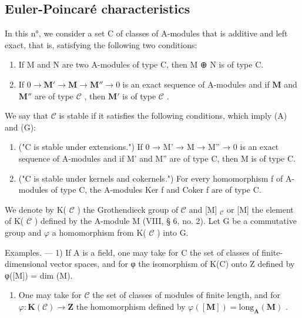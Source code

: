 \subsection{Euler-Poincaré characteristics}

In this n°, we consider a set C of classes of A-modules that is additive and left exact, that is, satisfying the following two conditions:

\begin{enumerate}
\def\labelenumi{(\Alph{enumi})}
\item
  If M and N are two A-modules of type C, then M ⊕ N is of type C.
\item
  If \(0 \to \mathbf{M}' \to \mathbf{M} \to \mathbf{M}'' \to 0\) is an exact sequence of A-modules and if \(\mathbf{M}\) and \(\mathbf{M}''\) are of type \(\mathcal{C}\) , then \(\mathbf{M}'\) is of type \(\mathcal{C}\) .
\end{enumerate}

We say that \(\mathcal{C}\) is stable if it satisfies the following conditions, which imply (A) and (G):

\begin{enumerate}
\def\labelenumi{(\Alph{enumi})}
\setcounter{enumi}{4}
\item
  ("C is stable under extensions.") If 0 → M' → M → M'' → 0 is an exact sequence of A-modules and if M' and M'' are of type C, then M is of type C.
\item
  ("C is stable under kernels and cokernels.") For every homomorphism f of A-modules of type C, the A-modules Ker f and Coker f are of type C.
\end{enumerate}

We denote by K( \(\mathcal{C}\) ) the Grothendieck group of \(\mathcal{C}\) and {[}M{]} \(_{\mathcal{C}}\) or {[}M{]} the element of K( \(\mathcal{C}\) ) defined by the A-module M (VIII, § 6, no. 2). Let G be a commutative group and \(\varphi\) a homomorphism from K( \(\mathcal{C}\) ) into G.

Examples. --- 1) If A is a field, one may take for C the set of classes of finite-dimensional vector spaces, and for φ the isomorphism of K(C) onto Z defined by φ({[}M{]}) = dim (M).

\begin{enumerate}
\def\labelenumi{\arabic{enumi})}
\setcounter{enumi}{1}
\tightlist
\item
  One may take for \(\mathcal{C}\) the set of classes of modules of finite length, and for \(\varphi: \mathbf{K}(\mathcal{C}) \to \mathbf{Z}\) the homomorphism defined by \(\varphi([\mathbf{M}]) = \text{long}_{\mathbf{A}}(\mathbf{M})\) .
\end{enumerate}

